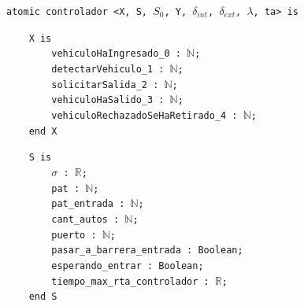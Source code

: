 \documentclass[12pt]{article}
\begin{document}
\begin{tcolorbox}[
    colback=black!5!white,
    colframe=black!80!white,
    boxrule=0.8pt,
    arc=2pt,
    left=5pt,
    right=5pt,
    top=5pt,
    bottom=5pt,
    fontupper=\ttfamily,
    breakable
]
\begin{flushleft}
\texttt{atomic controlador <X, S, $S_0$, Y, }$\delta_{int}$\texttt{, }$\delta_{ext}$\texttt{, }$\lambda$\texttt{, ta> is}
\end{flushleft}

\begin{flushleft}
\texttt{~~~~X is} \\
\texttt{~~~~~~~~vehiculoHaIngresado\_0 : }\(\mathbb{N}\)\texttt{;} \\
\texttt{~~~~~~~~detectarVehiculo\_1 : }\(\mathbb{N}\)\texttt{;} \\
\texttt{~~~~~~~~solicitarSalida\_2 : }\(\mathbb{N}\)\texttt{;} \\
\texttt{~~~~~~~~vehiculoHaSalido\_3 : }\(\mathbb{N}\)\texttt{;} \\
\texttt{~~~~~~~~vehiculoRechazadoSeHaRetirado\_4 : }\(\mathbb{N}\)\texttt{;} \\
\texttt{~~~~end X}
\end{flushleft}

\begin{flushleft}
\texttt{~~~~S is} \\
\texttt{~~~~~~~~}$\sigma$\texttt{ : }\(\mathbb{R}\)\texttt{;} \\
\texttt{~~~~~~~~pat : }\(\mathbb{N}\)\texttt{;} \\
\texttt{~~~~~~~~pat\_entrada : }\(\mathbb{N}\)\texttt{;} \\
\texttt{~~~~~~~~cant\_autos : }\(\mathbb{N}\)\texttt{;} \\
\texttt{~~~~~~~~puerto : }\(\mathbb{N}\)\texttt{;} \\
\texttt{~~~~~~~~pasar\_a\_barrera\_entrada : Boolean;} \\
\texttt{~~~~~~~~esperando\_entrar : Boolean;} \\
\texttt{~~~~~~~~tiempo\_max\_rta\_controlador : }\(\mathbb{R}\)\texttt{;} \\
\texttt{~~~~end S}
\end{flushleft}


\end{tcolorbox}
\end{document}
